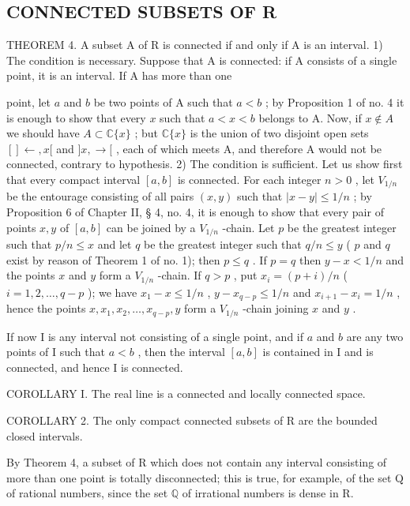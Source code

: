 \subsection{CONNECTED SUBSETS OF R}

THEOREM 4. A subset A of R is connected if and only if A is an interval. 1) The condition is necessary. Suppose that A is connected: if A consists of a single point, it is an interval. If A has more than one

point, let \(a\) and \(b\) be two points of A such that \(a < b\) ; by Proposition 1 of no. 4 it is enough to show that every \(x\) such that \(a < x < b\) belongs to A. Now, if \(x \notin A\) we should have \(A \subset \mathbb{C}\{x\}\) ; but \(\mathbb{C}\{x\}\) is the union of two disjoint open sets \([] \leftarrow, x[\) and \(]x, \rightarrow[\) , each of which meets A, and therefore A would not be connected, contrary to hypothesis. 2) The condition is sufficient. Let us show first that every compact interval \([a, b]\) is connected. For each integer \(n > 0\) , let \(V_{1/n}\) be the entourage consisting of all pairs \((x, y)\) such that \(|x - y| \leqslant 1/n\) ; by Proposition 6 of Chapter II, § 4, no. 4, it is enough to show that every pair of points \(x, y\) of \([a, b]\) can be joined by a \(V_{1/n}\) -chain. Let \(p\) be the greatest integer such that \(p/n \leqslant x\) and let \(q\) be the greatest integer such that \(q/n \leqslant y\) ( \(p\) and \(q\) exist by reason of Theorem 1 of no. 1); then \(p \leqslant q\) . If \(p = q\) then \(y - x < 1/n\) and the points \(x\) and \(y\) form a \(V_{1/n}\) -chain. If \(q > p\) , put \(x_i = (p + i)/n\) ( \(i = 1, 2, \ldots, q - p\) ); we have \(x_1 - x \leqslant 1/n\) , \(y - x_{q-p} \leqslant 1/n\) and \(x_{i+1} - x_i = 1/n\) , hence the points \(x, x_1, x_2, \ldots, x_{q-p}, y\) form a \(V_{1/n}\) -chain joining \(x\) and \(y\) .

If now I is any interval not consisting of a single point, and if \(a\) and \(b\) are any two points of I such that \(a < b\) , then the interval \([a, b]\) is contained in I and is connected, and hence I is connected.

COROLLARY I. The real line is a connected and locally connected space.

COROLLARY 2. The only compact connected subsets of R are the bounded closed intervals.

By Theorem 4, a subset of R which does not contain any interval consisting of more than one point is totally disconnected; this is true, for example, of the set Q of rational numbers, since the set \(\mathbb{Q}\) of irrational numbers is dense in R.

